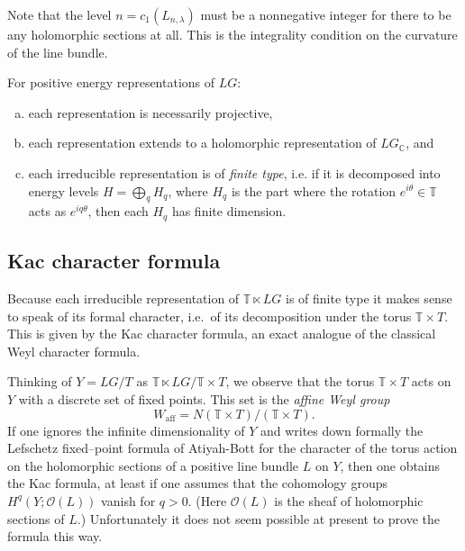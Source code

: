 \documentclass[12pt]{article}
\begin{document}
\begin{remark}
    Note that the level $n = c_1(L_{n,\lambda})$ must be a nonnegative integer for there to be any holomorphic sections at all. This is the integrality condition on the curvature of the line bundle. 
\end{remark}

\begin{corollary}[4.3]
For positive energy representations of $LG$:
\begin{enumerate}[(a)]
\item each representation is necessarily projective,
\item each representation extends to a holomorphic representation
of $LG_{\mathbb{C}}$, and
\item each irreducible representation is of \emph{finite type}, i.e.
if it is decomposed into energy levels
$H = \bigoplus_q H_q$, where $H_q$ is the part where the rotation
$e^{i\theta} \in \mathbb{T}$ acts as $e^{iq\theta}$,
then each $H_q$ has finite dimension.
\end{enumerate}
\end{corollary}

\subsection{Kac character formula}
Because each irreducible representation of $\mathbb{T} \ltimes LG$
is of finite type it makes sense to speak of its formal character,
i.e.\ of its decomposition under the torus
$\mathbb{T} \times T$.  This is given by the Kac character formula,
an exact analogue of the classical Weyl character formula.

Thinking of $Y = LG/T$ as $\mathbb{T} \ltimes LG / \mathbb{T} \times T$,
we observe that the torus $\mathbb{T} \times T$ acts on $Y$
with a discrete set of fixed points.
This set is the \emph{affine Weyl group}
\[
W_{\mathrm{aff}}
= N(\mathbb{T} \times T) / (\mathbb{T} \times T).
\]
If one ignores the infinite dimensionality of $Y$ and writes down formally
the Lefschetz fixed--point formula of Atiyah-Bott
for the character of the torus action on the holomorphic sections
of a positive line bundle $L$ on $Y$,
then one obtains the Kac formula,
at least if one assumes that the cohomology groups
$H^q(Y; \mathcal{O}(L))$ vanish for $q>0$.
(Here $\mathcal{O}(L)$ is the sheaf of holomorphic sections of $L$.)
Unfortunately it does not seem possible at present to prove the formula this way.
\end{document}
